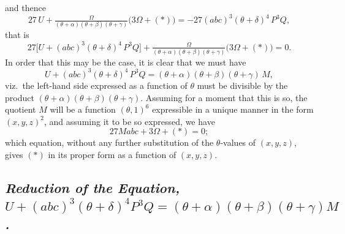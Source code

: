 \documentclass[11pt,a4paper]{article}
\begin{document}
and thence
\[
27 \, U + \tfrac{\Omega}{(\theta + \alpha)(\theta + \beta)(\theta + \gamma)} \bigl(3 \Omega + (*)\bigr)
 = -27 (abc)^3 (\theta + \delta)^4 \, P^3 Q,
\]
that is
\[
27 \bigl[ U + (abc)^3 (\theta + \delta)^4 \, P^3 Q \bigr]
 + \tfrac{\Omega}{(\theta + \alpha)(\theta + \beta)(\theta + \gamma)} \bigl(3 \Omega + (*)\bigr) = 0.
\]
In order that this may be the case, it is clear that we must have
\[
U + (abc)^3 (\theta + \delta)^4 \, P^3 Q = (\theta + \alpha)(\theta + \beta)(\theta + \gamma) \, M,
\]
viz.\ the left-hand side expressed as a function of $\theta$ must be divisible by the
product $(\theta + \alpha)(\theta + \beta)(\theta + \gamma)$. Assuming for a moment that
this is so, the quotient $M$ will be a function $(\theta, 1)^6$ expressible in a unique
manner in the form $(x, y, z)^2$, and assuming it to be so expressed, we have
\[
27 M abc + 3 \Omega + (*) = 0;
\]
which equation, without any further substitution of the $\theta$-values of $(x, y, z)$,
gives $(*)$ in its proper form as a function of $(x, y, z)$.

\subsection*{\textit{Reduction of the Equation, $U + (abc)^3 (\theta + \delta)^4 P^3 Q = (\theta + \alpha)(\theta + \beta)(\theta + \gamma) M$.}}
\end{document}
